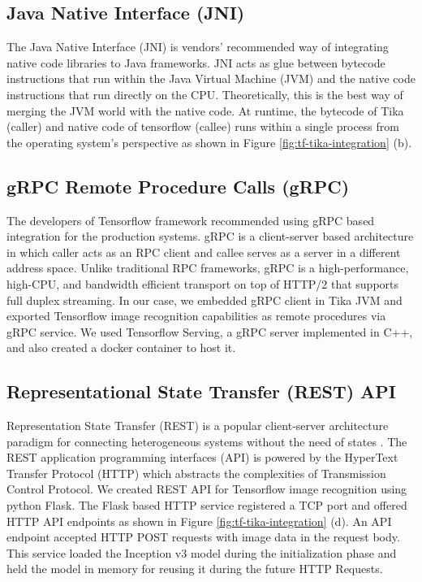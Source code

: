 \subsection{Java Native Interface (JNI)} \label{sec:int-jni}
The Java Native Interface (JNI) is vendors' recommended way of integrating native code libraries to Java frameworks\cite{}. JNI acts as glue between bytecode instructions that run within the Java Virtual Machine (JVM) and the native code instructions that run directly on the CPU. Theoretically, this is the best way of merging the JVM world with the native code\cite{}. At runtime, the bytecode of Tika (caller) and native code of tensorflow (callee) runs within a single process from the operating system's perspective as shown in Figure \ref{fig:tf-tika-integration} (b).


\subsection{gRPC Remote Procedure Calls (gRPC)} \label{sec:int-rpc}
The developers of Tensorflow framework recommended using gRPC based integration for the production systems\cite{goog-tfserve}. gRPC is a client-server based architecture in which caller acts as an RPC client and callee serves as a server in a different address space. Unlike traditional RPC frameworks, gRPC is a high-performance, high-CPU, and bandwidth efficient transport on top of HTTP/2 that supports full duplex streaming\cite{about-grpc}. In our case, we embedded gRPC client in Tika JVM and exported Tensorflow image recognition capabilities as remote procedures via gRPC service. We used Tensorflow Serving, a gRPC server implemented in C++, and also created a docker container to host it.


\subsection{Representational State Transfer (REST) API} \label{sec:int-rest}
Representation State Transfer (REST) is a popular client-server architecture paradigm for connecting heterogeneous systems without the need of states \cite[Chapter~5]{Fielding:2000:ASD:932295}. The REST application programming interfaces (API) is powered by the HyperText Transfer Protocol (HTTP) which abstracts the complexities of Transmission Control Protocol.
We created REST API for Tensorflow image recognition using python Flask. The Flask based HTTP service registered a TCP port and offered HTTP API endpoints as shown in Figure \ref{fig:tf-tika-integration} (d).
An API endpoint accepted HTTP POST requests with image data in the request body. This service loaded the Inception v3 \cite{SzegedyVISW15} model during the initialization phase and held the model in memory for reusing it during the future HTTP Requests.

